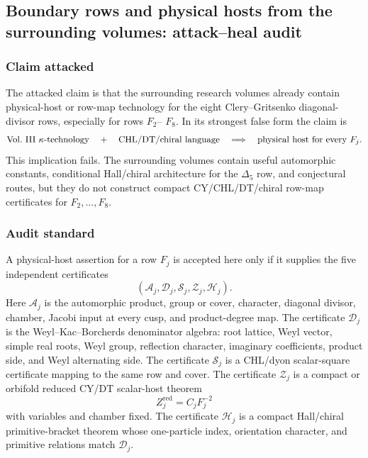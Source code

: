 \subsection{\texorpdfstring{Boundary rows and physical hosts from the
surrounding volumes: attack--heal audit}{Boundary rows and physical
hosts from the surrounding volumes: attack-heal audit}}

\subsubsection*{Claim attacked}

The attacked claim is that the surrounding research volumes already
contain physical-host or row-map technology for the eight
Clery--Gritsenko diagonal-divisor rows, especially for rows \(F_2\)--
\(F_8\).  In its strongest false form the claim is
\[
\mathrm{Vol.\ III\ } \kappa\hbox{-}\mathrm{technology}
\quad+\quad
\mathrm{CHL/DT/chiral\ language}
\quad\Longrightarrow\quad
\mathrm{physical\ host\ for\ every\ }F_j .
\]
This implication fails.  The surrounding volumes contain useful
automorphic constants, conditional Hall/chiral architecture for the
\(\Delta_5\) row, and conjectural routes, but they do not construct
compact CY/CHL/DT/chiral row-map certificates for \(F_2,\ldots,F_8\).

\subsubsection*{Audit standard}

A physical-host assertion for a row \(F_j\) is accepted here only if it
supplies the five independent certificates
\[
(\mathscr A_j,\mathscr D_j,\mathscr S_j,\mathscr Z_j,\mathscr H_j).
\]
Here \(\mathscr A_j\) is the automorphic product, group or cover,
character, diagonal divisor, chamber, Jacobi input at every cusp, and
product-degree map.  The certificate \(\mathscr D_j\) is the
Weyl--Kac--Borcherds denominator algebra: root lattice, Weyl vector,
simple real roots, Weyl group, reflection character, imaginary
coefficients, product side, and Weyl alternating side.  The certificate
\(\mathscr S_j\) is a CHL/dyon scalar-square certificate mapping to the
same row and cover.  The certificate \(\mathscr Z_j\) is a compact or
orbifold reduced CY/DT scalar-host theorem
\[
  Z^{\mathrm{red}}_j=C_jF_j^{-2}
\]
with variables and chamber fixed.  The certificate
\(\mathscr H_j\) is a compact Hall/chiral primitive-bracket theorem
whose one-particle index, orientation character, and primitive
relations match \(\mathscr D_j\).

